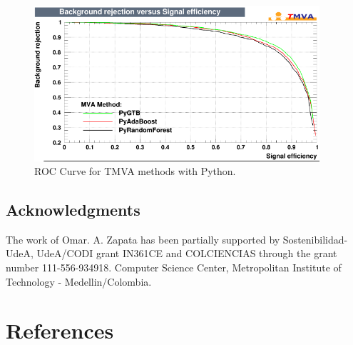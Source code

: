\documentclass[a4paper]{jpconf}
\begin{document}
\begin{figure}[h]
\centering
\includegraphics[width=25pc]{img/pymvaroc.png}\caption{\label{pymvaroc} ROC Curve for TMVA methods with Python.}
\end{figure}





\subsection{Acknowledgments}

The work of Omar. A. Zapata has been partially supported by Sostenibilidad-UdeA, UdeA/CODI grant IN361CE
and COLCIENCIAS through the grant number 111-556-934918.
Computer Science Center, Metropolitan Institute of Technology - Medellin/Colombia.









\section*{References}

\end{document}
